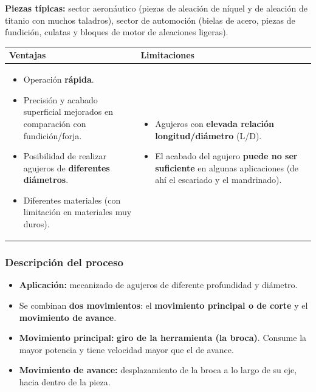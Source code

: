 \documentclass[12pt,a4paper]{article}
\begin{document}
\textbf{Piezas típicas:} sector aeronáutico (piezas de aleación de níquel y de
aleación de titanio con muchos taladros), sector de automoción (bielas de acero,
piezas de fundición, culatas y bloques de motor de aleaciones ligeras).

\begin{center}
	\begin{tabular}{@{}p{7.3cm}p{7.3cm}@{}}
		\toprule
		\textbf{Ventajas}
		                                                                          &
		\textbf{Limitaciones}
		\\
		\midrule
		\begin{itemize}[leftmargin=10pt,nosep]
			\item Operación \textbf{rápida}.
			\item Precisión y acabado superficial mejorados en comparación con
			      fundición/forja.
			\item Posibilidad de realizar agujeros de \textbf{diferentes diámetros}.
			\item Diferentes materiales (con limitación en materiales muy duros).
		\end{itemize} &
		\begin{itemize}[leftmargin=10pt,nosep]
			\item Agujeros con \textbf{elevada relación longitud/diámetro} (L/D).
			\item El acabado del agujero \textbf{puede no ser suficiente} en algunas
			      aplicaciones (de ahí el escariado y el mandrinado).
		\end{itemize}    \\
		\bottomrule
	\end{tabular}
\end{center}

\subsubsection{Descripción del proceso}
\begin{itemize}
	\item \textbf{Aplicación:} mecanizado de agujeros de diferente profundidad y
	      diámetro.
	\item Se combinan \textbf{dos movimientos}: el \textbf{movimiento principal o
		      de corte} y el \textbf{movimiento de avance}.
	\item \textbf{Movimiento principal:} \textbf{giro de la herramienta (la
		      broca)}. Consume la mayor potencia y tiene velocidad mayor que el de
	      avance.
	\item \textbf{Movimiento de avance:} desplazamiento de la broca a lo largo de
	      su eje, hacia dentro de la pieza.
\end{itemize}
\end{document}
